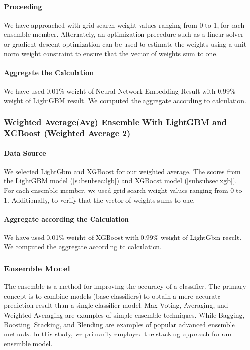 \documentclass[sigconf, nonacm]{acmart}
\begin{document}
\paragraph{Proceeding}
We have approached with grid search weight values ranging from 0 to 1, for each ensemble member. Alternately, an optimization procedure such as a linear solver or gradient descent optimization can be used to estimate the weights using a unit norm weight constraint to ensure that the vector of weights sum to one.
\paragraph{Aggregate the Calculation}
We have used 0.01\% weight of Neural Network Embedding Result with 0.99\% weight of LightGBM result. We computed the aggregate according to calculation.

	
	 
\subsubsection{Weighted Average(Avg) Ensemble With LightGBM and XGBoost (Weighted Average 2)} \label{subsubsec:wa_2}
\paragraph{Data Source}
We selected LightGbm and XGBoost for our weighted average. The scores from the LightGBM model (\ref{subsubsec:lgb}) and XGBoost model (\ref{subsubsec:xgb}).
For each ensemble member, we used grid search weight values ranging from 0 to 1. Additionally, to verify that the vector of weights sums to one. 
\paragraph{Aggregate according the Calculation}
We have used 0.01\% weight of XGBoost with 0.99\% weight of LightGbm result. We computed the aggregate according to calculation.
	 
      
         
         
         
\subsubsection{Ensemble Model} \label{subsubsec:ensemble}
The ensemble is a method for improving the accuracy of a classifier. The primary concept is to combine models (base classifiers) to obtain a more accurate prediction result than a single classifier model. Max Voting, Averaging, and Weighted Averaging are examples of simple ensemble techniques. While Bagging, Boosting, Stacking, and Blending are examples of popular advanced ensemble methods. In this study, we primarily employed the stacking approach for our ensemble model.
    
\end{document}
